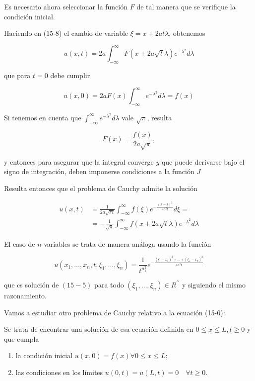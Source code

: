 \documentclass[10pt]{article}
\theoremstyle{plain}
\theoremstyle{definition}
\theoremstyle{remark}
\begin{document}
Es necesario ahora seleccionar la función $F$ de tal manera que se verifique la condición inicial.

Haciendo en (15-8) el cambio de variable $\xi=x+2 a t \lambda$, obtenemos

$$
u(x, t)=2 a \int_{-\infty}^{\infty} F(x+2 a \sqrt{t} \lambda) e^{-\lambda^{2}} d \lambda
$$

que para $t=0$ debe cumplir

$$
u(x, 0)=2 a F(x) \int_{-\infty}^{\infty} e^{-\lambda^{2}} d \lambda=f(x)
$$

Si tenemos en cuenta que $\int_{-\infty}^{\infty} e^{-\lambda^{2}} d \lambda$ vale $\sqrt{\pi}$, resulta

$$
F(x)=\frac{f(x)}{2 a \sqrt{\pi}},
$$

y entonces para asegurar que la integral converge $y$ que puede derivarse bajo el signo de integración, deben imponerse condiciones a la función $J$

Resulta entonces que el problema de Cauchy admite la solución

$$
\begin{aligned}
u(x, t) & =\frac{1}{2 a \sqrt{\pi t}} \int_{-\infty}^{\infty} f(\xi) e^{-\frac{(x-\xi)^{2}}{4 a^{2} t}} d \xi= \\
& =-\frac{1}{\sqrt{\pi}} \int_{-\infty}^{\infty} f(x+2 a \sqrt{t} \lambda) e^{-\lambda^{2}} d \lambda
\end{aligned}
$$

El caso de $n$ variables se trata de manera análoga usando la función

$$
u\left(x_{1}, \ldots, x_{n}, t, \xi_{1}, \ldots, \xi_{n}\right)=\frac{1}{t^{n_{1}^{2}}} e^{-\frac{\left(\xi_{1}-x_{1}\right)^{2}+\ldots+\left(\xi_{n}-x_{n}\right)^{2}}{4 a^{2} t}}
$$

que cs solución de $(15-5)$ para todo $\left(\xi_{1}, \ldots, \xi_{n}\right) \in R^{\prime \prime}$ y siguiendo el mismo razonamiento.

Vamos a estudiar otro problema de Cauchy relativo a la ecuación (15-6):

Se trata de encontrar una solución de esa ecuación definida en $0 \leqslant x \leqslant L, t \geqslant 0$ y que cumpla

\begin{enumerate}
  \item la condición inicial $u(x, 0)=f(x) \forall 0 \leqslant x \leqslant L$;
  \item las condiciones en los límites $u(0, t)=u(L, t)=0 \quad \forall t \geqslant 0$.
\end{enumerate}
\end{document}
